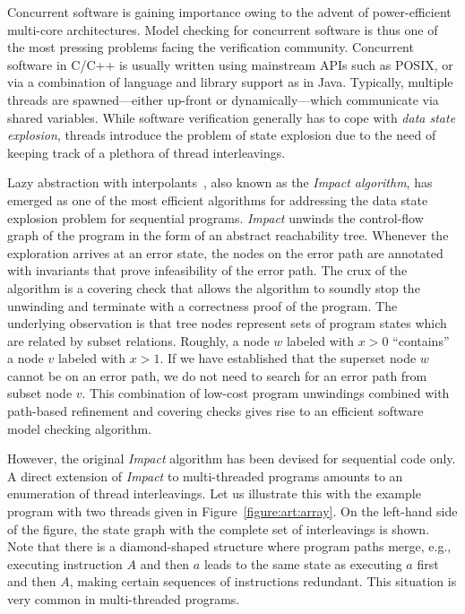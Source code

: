 \documentclass[conference]{IEEEtran}
\begin{document}
Concurrent software is gaining importance owing to the advent of
power-efficient multi-core architectures.  Model checking for concurrent
software is thus one of the most pressing problems facing the verification
community.  Concurrent software in C/C++ is usually written using mainstream
APIs such as POSIX, or via a combination of language and library
support as in Java.  Typically, multiple threads are spawned---either
up-front or dynamically---which communicate via shared variables.  While
software verification generally has to cope with \emph{data state
explosion}, threads introduce the problem of state explosion due to the
need of keeping track of a plethora of thread interleavings.


Lazy abstraction with interpolants~\cite{DBLP:conf/cav/McMillan06}, also known as the \emph{Impact
algorithm}, has emerged as one of the most efficient algorithms for
addressing the data state explosion problem for sequential programs.
\emph{Impact} unwinds the control-flow graph of the program in the form of
an abstract reachability tree.  Whenever the exploration arrives at an error
state, the nodes on the error path are annotated with invariants that prove
infeasibility of the error path.  The crux of the algorithm is a covering
check that allows the algorithm to soundly stop the unwinding and terminate
with a correctness proof of the program.  The underlying observation is that
tree nodes represent sets of program states which are related by subset
relations.  Roughly, a node $w$ labeled with $x>0$ ``contains'' a node $v$
labeled with $x>1$.  If we have established that the superset node $w$
cannot be on an error path, we do not need to search for an error path from
subset node $v$.  This combination of low-cost program unwindings combined
with path-based refinement and covering checks gives rise to an efficient
software model checking algorithm.

However, the original \emph{Impact} algorithm has been devised for
sequential code only.  A direct extension of \emph{Impact} to multi-threaded
programs amounts to an enumeration of thread interleavings.  Let us
illustrate this with the example program with two threads given in
Figure~\ref{figure:art:array}.  On the left-hand side of the figure, the
state graph with the complete set of interleavings is shown.  Note that
there is a diamond-shaped structure where program paths merge, e.g.,
executing instruction $A$ and then $a$ leads to the same state as executing
$a$ first and then $A$, making certain sequences of instructions redundant. 
This situation is very common in multi-threaded programs.
\end{document}
